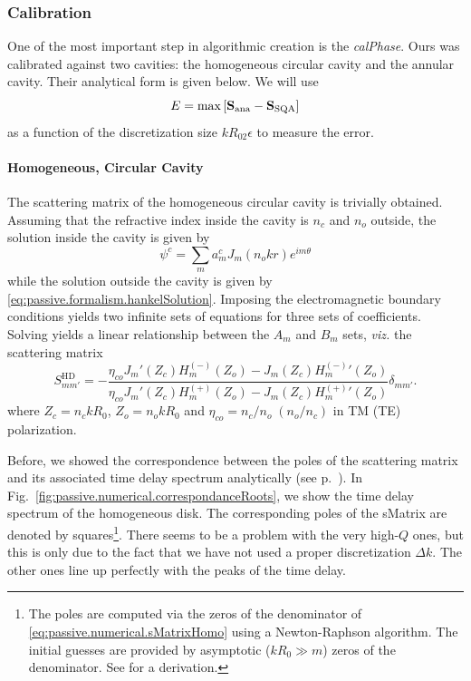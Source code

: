 \subsubsection{Calibration}
One of the most important step in algorithmic creation
is the \textit{\gls{calPhase}}. Ours was calibrated
against two cavities: the homogeneous circular cavity and 
the annular cavity. Their analytical form is given below.
We will use 
  \begin{equation}
   E = \max\left[\mathbf{S}_\text{ana}-\mathbf{S}_\text{SQA}\right] 
  \end{equation}
as a function of the discretization size $kR_02\epsilon$ to measure
the error. 

\paragraph{Homogeneous, Circular Cavity}
The scattering matrix of the homogeneous circular cavity
is trivially obtained. Assuming that the refractive index inside
the cavity is $n_c$ and $n_o$ outside, the solution inside the 
cavity is given by 
  \begin{equation}
   \psi^c = \sum_m a_m^cJ_m(n_okr)e^{im\theta}
  \end{equation}
while the solution outside the cavity is given by \eqref{eq:passive.formalism.hankelSolution}.
Imposing the electromagnetic boundary conditions yields two infinite sets of equations
for three sets of coefficients. Solving yields a linear relationship between the 
$A_m$ and $B_m$ sets, \textit{viz.} the scattering matrix
  \begin{equation}
   \label{eq:passive.numerical.sMatrixHomo}
   S_{mm'}^\text{HD} = -  \frac{\eta_{co}J_m'(Z_c)H_m^{(-)}(Z_o)-J_m(Z_c){H^{(-)}_m}'(Z_o)}
				{\eta_{co}J_m'(Z_c)H_m^{(+)}(Z_o)-J_m(Z_c){H^{(+)}_m}'(Z_o)}\delta_{mm'}.
  \end{equation}
where $Z_c = n_ckR_0$, $Z_o=n_okR_0$ and $\eta_{co}= n_c/n_o\; (n_o/n_c)$ in TM (TE) polarization.

Before, we showed the correspondence between the poles of the scattering matrix and its associated
time delay spectrum analytically (see p.~\pageref{eq:passive.formalism.lorentzianDelays}). 
In Fig.~\ref{fig:passive.numerical.correspondanceRoots}, we show the
time delay spectrum of the homogeneous disk. The corresponding poles of the \gls{sMatrix} are denoted
by squares\footnote{The poles are computed via the zeros of the denominator of \eqref{eq:passive.numerical.sMatrixHomo}
using a Newton-Raphson algorithm. The initial guesses are provided by asymptotic ($kR_0\gg m$) zeros
of the denominator. See \cite[Annexe A.2.4]{GAG2011} for a derivation.}. There seems to be a problem with the very high-$Q$ ones, but this is only due to the fact
that we have not used a proper discretization $\Delta k$. The other ones line up perfectly with the peaks
of the time delay. 

